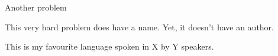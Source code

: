 \documentclass[a4paper, 12pt, english]{article}
\begin{document}
\begin{problem}{Another problem}

This very hard problem does have a name. Yet, it doesn't have an author.

\begin{tasks}
\end{tasks}

\begin{langinfo*}
This is my favourite language spoken in X by Y speakers.
\end{langinfo*}

\end{problem}
\end{document}
